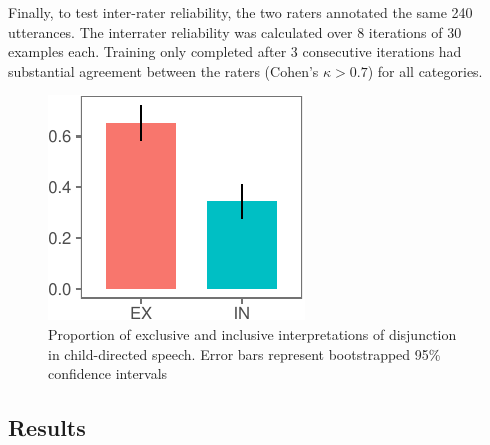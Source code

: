 \documentclass[10pt, letterpaper]{article}
\newenvironment{CodeChunk}{}{}
\begin{document}
Finally, to test inter-rater reliability, the two raters annotated the
same 240 utterances. The interrater reliability was calculated over 8
iterations of 30 examples each. Training only completed after 3
consecutive iterations had substantial agreement between the raters
(Cohen's \(\kappa > 0.7\)) for all categories.

\begin{CodeChunk}
\begin{figure}[b]

{\centering \includegraphics{figs/interpretation-1} 

}

\caption[Proportion of exclusive and inclusive interpretations of disjunction in child-directed speech]{Proportion of exclusive and inclusive interpretations of disjunction in child-directed speech. Error bars represent bootstrapped 95\% confidence intervals}\label{fig:interpretation}
\end{figure}
\end{CodeChunk}

\subsection{Results}\label{results-1}
\end{document}
